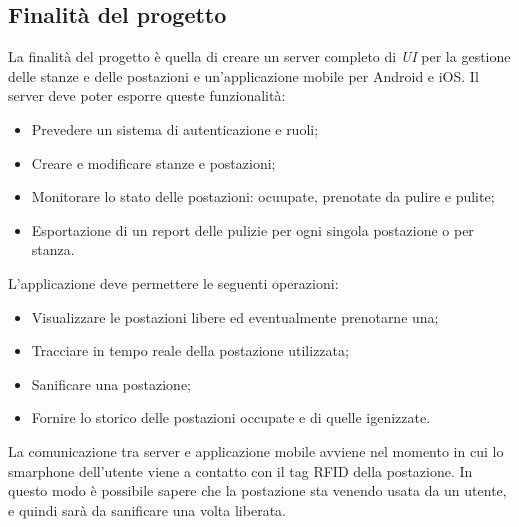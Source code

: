\subsection{Finalità del progetto}
La finalità del progetto è quella di creare un server completo di \textit{UI} per la gestione delle stanze e delle postazioni e un'applicazione mobile per Android e iOS.
Il server deve poter esporre queste funzionalità:
\begin{itemize}
    \item Prevedere un sistema di autenticazione e ruoli;
    \item Creare e modificare stanze e postazioni;
    \item Monitorare lo stato delle postazioni: ocuupate, prenotate da pulire e pulite;
    \item Esportazione di un report delle pulizie per ogni singola postazione o per stanza.
\end{itemize}
L'applicazione deve permettere le seguenti operazioni:
\begin{itemize}
    \item Visualizzare le postazioni libere ed eventualmente prenotarne una;
    \item Tracciare in tempo reale della postazione utilizzata;
    \item Sanificare una postazione;
    \item Fornire lo storico delle postazioni occupate e di quelle igenizzate.
\end{itemize}
La comunicazione tra server e applicazione mobile avviene nel momento in cui lo smarphone dell'utente viene a contatto con il tag RFID della postazione.
In questo modo è possibile sapere che la postazione sta venendo usata da un utente, e quindi sarà da sanificare una volta liberata.

